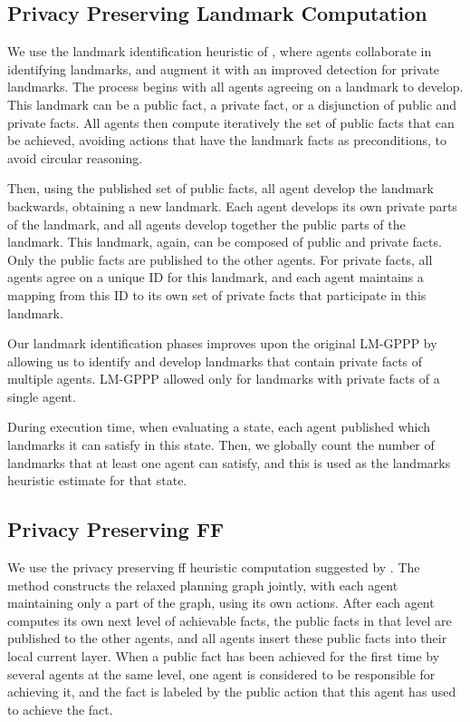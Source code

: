 \documentclass[letterpaper]{article}
\theoremstyle{definition}
\begin{document}
\subsection{Privacy Preserving Landmark Computation}

We use the landmark identification heuristic of \citep{maliah2014privacyPreserving}, where agents collaborate in identifying landmarks, and augment it with an improved detection for private landmarks. The process begins with all agents agreeing on a landmark to develop. This landmark can be a public fact, a private fact, or a disjunction of public and private facts. All agents then compute iteratively the set of public facts that can be achieved, avoiding actions that have the landmark facts as preconditions, to avoid circular reasoning.

Then, using the published set of public facts, all agent develop the landmark backwards, obtaining a new landmark. Each agent develops its own private parts of the landmark, and all agents develop together the public parts of the landmark.
This landmark, again, can be composed of public and private facts. Only the public facts are published to the other agents. For private facts, all agents agree on a unique ID for this landmark, and each agent maintains a mapping from this ID to its own set of private facts that participate in this landmark. 

Our landmark identification phases improves upon the original LM-GPPP by allowing us to identify and develop landmarks that contain private facts of multiple agents. LM-GPPP allowed only for landmarks with private facts of a single agent.

During execution time, when evaluating a state, each agent published which landmarks it can satisfy in this state. Then, we globally count the number of landmarks that at least one agent can satisfy, and this is used as the landmarks heuristic estimate for that state.

\subsection{Privacy Preserving FF}

We use the privacy preserving ff heuristic computation suggested by \citep{vstolba2015admissible}. The method constructs the relaxed planning graph jointly, with each agent maintaining only a part of the graph, using its own actions. After each agent computes its own next level of achievable facts, the public facts in that level are published to the other agents, and all agents insert these public facts into their local current layer. When a public fact has been achieved for the first time by several agents at the same level, one agent is considered to be responsible for achieving it, and the fact is labeled by the public action that this agent has used to achieve the fact.
\end{document}
